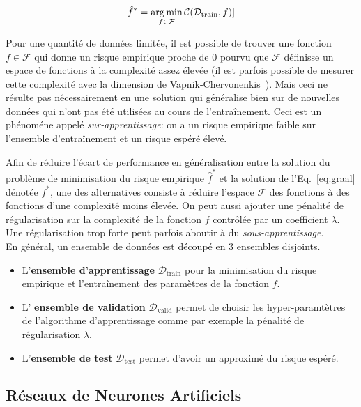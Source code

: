 \begin{equation}
\label{eq:graal}
\hat{f}^* = \operatorname*{arg\,min}_{f \in \mathcal{F}} \mathcal{C}(\mathcal{D}_\textrm{train},f)]
\end{equation}

Pour une quantité de données limitée, il est possible de trouver une fonction
$f\in\mathcal{F}$ qui donne un risque empirique proche de $0$ pourvu que
$\mathcal{F}$ définisse un espace de fonctions à la complexité assez élevée (il
est parfois possible de mesurer cette complexité avec la dimension de
Vapnik-Chervonenkis~\cite{Vapnik71}). Mais ceci ne résulte pas nécessairement en une solution
qui généralise bien sur de nouvelles données qui n'ont pas été utilisées au
cours de l'entraînement. Ceci est un phénoméne appelé \emph{sur-apprentissage}:
on a un risque empirique faible sur l'ensemble d'entraînement et un risque
espéré élevé. 

Afin de réduire l'écart de performance en généralisation entre la solution du
problème de minimisation du risque empirique $\hat{f}^*$ et la solution de
l'Eq.~\ref{eq:graal} dénotée $f^*$, une des alternatives consiste à réduire
l'espace $\mathcal{F}$ des fonctions à des fonctions d'une complexité moins
élevée. On peut aussi ajouter une pénalité de régularisation sur la complexité
de la fonction $f$ contrôlée par un coefficient $\lambda$. Une régularisation
trop forte peut parfois aboutir à du \emph{sous-apprentissage}.  \\

En général, un ensemble de données est découpé en $3$ ensembles disjoints.


\begin{itemize}

\item L'{\bf ensemble d'apprentissage} $\mathcal{D}_\textrm{train}$ pour la
minimisation du risque empirique et l'entraînement des paramètres de la
fonction $f$.

\item L' {\bf ensemble de validation} $\mathcal{D_{\mathrm{valid}}}$ permet de
choisir les hyper-paramtètres de l'algorithme d'apprentissage comme par exemple
la pénalité de régularisation $\lambda$.

\item L'{\bf ensemble de test} $\mathcal{D_{\mathrm{test}}}$  permet d'avoir un
approximé du risque espéré.

\end{itemize}


\subsection{Réseaux de Neurones Artificiels}

